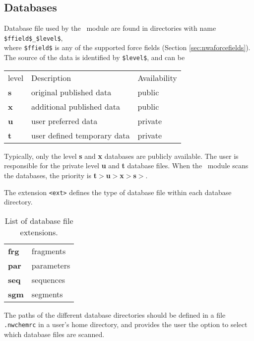 \subsection{Databases}
Database file used by the \prepare\ module are found in directories 
with name \verb+$ffield$_$level$+, \\
where \verb+$ffield$+ is any of the
supported force fields (Section \ref{sec:nwaforcefields}). 
The source of the data is identified by \verb+$level$+, and can be 
\begin{center}
\begin{tabular}{lll}
\hline
level   & Description                 & Availability \\
{\bf s} & original published data     & public       \\
{\bf x} & additional published data   & public       \\
{\bf u} & user preferred data         & private      \\
{\bf t} & user defined temporary data & private    \\
\hline
\end{tabular}
\end{center}

Typically, only the level {\bf s} and {\bf x} databases are publicly 
available. 
The user is responsible for the private level {\bf u} and {\bf t}
database files. When the \prepare\ module scans the databases, the priority
is {\bf t}$>${\bf u}$>${\bf x}$>${\bf s}$>$.

The extension \verb+<ext>+ defines the type of database file within each
database directory. 
\begin{table}[htbp]
\begin{center}
\begin{tabular}{ll}
{\bf frg} & fragments\\
{\bf par} & parameters\\
{\bf seq} & sequences\\
{\bf sgm} & segments\\
\end{tabular}
\end{center}
\caption{List of database file extensions.}
\end{table}


The paths of the different database directories should be defined in a file 
{\tt .nwchemrc} in a user's home directory, and provides the user the
option to select which database files are scanned.

